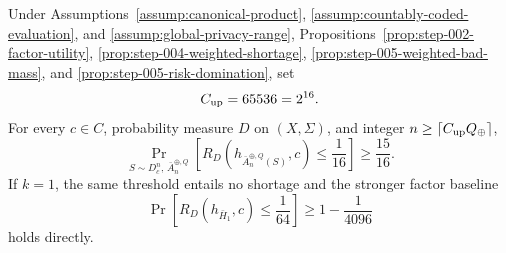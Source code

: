 \begin{proposition}
\label{prop:step-005-pac-closure}
Under Assumptions~\ref{assump:canonical-product},
\ref{assump:countably-coded-evaluation}, and
\ref{assump:global-privacy-range},
Propositions~\ref{prop:step-002-factor-utility},
\ref{prop:step-004-weighted-shortage},
\ref{prop:step-005-weighted-bad-mass}, and
\ref{prop:step-005-risk-domination}, set
\begin{equation}\label{eq:step-005-cup}
C_{\rm up}=65536=2^{16}.
\end{equation}
For every \(c\in C\), probability measure \(D\) on \((X,\Sigma)\), and
integer \(n\ge\lceil C_{\rm up}Q_\oplus\rceil\),
\begin{equation}\label{eq:step-005-pac-conclusion}
\Pr_{S\sim D_c^n,\,\bar A_n^{\oplus,Q}}
\left[R_D(h_{\bar A_n^{\oplus,Q}(S)},c)\le\frac1{16}\right]
\ge\frac{15}{16}.
\end{equation}
If \(k=1\), the same threshold entails no shortage and the stronger
factor baseline
\begin{equation}\label{eq:step-005-one-factor-utility}
\Pr\left[R_D(h_{\bar H_1},c)\le\frac1{64}\right]
\ge1-\frac1{4096}
\end{equation}
holds directly.
\end{proposition}

